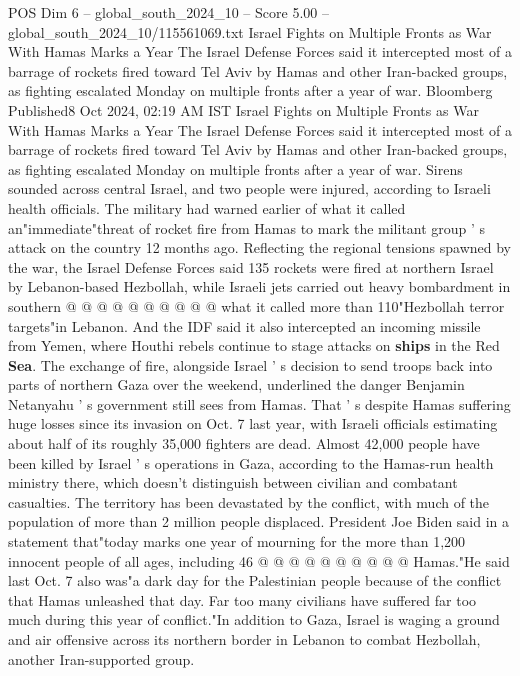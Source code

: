 \begin{textsample}{POS Dim 6 – global\_south\_2024\_10 – Score 5.00 – global\_south\_2024\_10/115561069.txt}  \label{ex:f6_pos_419}
Israel Fights on Multiple Fronts as War With Hamas Marks a Year The Israel Defense Forces said it intercepted most of a barrage of rockets fired toward Tel Aviv by Hamas and other Iran-backed groups, as fighting escalated Monday on multiple fronts after a year of war.
Bloomberg Published8 Oct 2024, 02:19 AM IST Israel Fights on Multiple Fronts as War With Hamas Marks a Year The Israel Defense Forces said it intercepted most of a barrage of rockets fired toward Tel Aviv by Hamas and other Iran-backed groups, as fighting escalated Monday on multiple fronts after a year of war.
Sirens sounded across central Israel, and two people were injured, according to Israeli health officials.
The military had warned earlier of what it called an"immediate"threat of rocket fire from Hamas to mark the militant group ' s attack on the country 12 months ago.
Reflecting the regional tensions spawned by the war, the Israel Defense Forces said 135 rockets were fired at northern Israel by Lebanon-based Hezbollah, while Israeli jets carried out heavy bombardment in southern @ @ @ @ @ @ @ @ @ @ what it called more than 110"Hezbollah terror targets"in Lebanon.
And the IDF said it also intercepted an incoming missile from Yemen, where Houthi rebels continue to stage attacks on \textbf{ships} in the Red \textbf{Sea}.
The exchange of fire, alongside Israel ' s decision to send troops back into parts of northern Gaza over the weekend, underlined the danger Benjamin Netanyahu ' s government still sees from Hamas.
That ' s despite Hamas suffering huge losses since its invasion on Oct. 7 last year, with Israeli officials estimating about half of its roughly 35,000 fighters are dead.
Almost 42,000 people have been killed by Israel ' s operations in Gaza, according to the Hamas-run health ministry there, which doesn't distinguish between civilian and combatant casualties.
The territory has been devastated by the conflict, with much of the population of more than 2 million people displaced.
President Joe Biden said in a statement that"today marks one year of mourning for the more than 1,200 innocent people of all ages, including 46 @ @ @ @ @ @ @ @ @ @ Hamas."He said last Oct. 7 also was"a dark day for the Palestinian people because of the conflict that Hamas unleashed that day.
Far too many civilians have suffered far too much during this year of conflict."In addition to Gaza, Israel is waging a ground and air offensive across its northern border in Lebanon to combat Hezbollah, another Iran-supported group.

\end{textsample}
